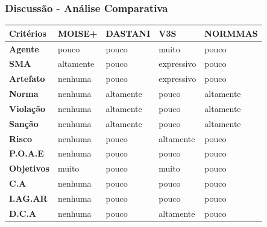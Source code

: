 \documentclass{beamer}
\begin{document}
\begin{frame}
	\frametitle{Discussão - Análise Comparativa}
	\begin{table}[H]
	    \centering
	    \begin{tabular}{|l|l|l|l|l|}
	        \hline
	        \textbf{Critérios} & \textbf{MOISE+}        & \textbf{DASTANI}	& \textbf{V3S}	& \textbf{NORMMAS}	\\ \hline	
	        \textbf{Agente}    & pouco                  & pouco   			& muito                & pouco     \\ \hline         							
	        \textbf{SMA}       & altamente              & pouco             & expressivo           & pouco       \\ \hline							
	        \textbf{Artefato}  & nenhuma                & pouco             & expressivo           & pouco       \\ \hline							
	        \textbf{Norma}     & nenhuma                & altamente		    & pouco                & altamente   \\ \hline								
	        \textbf{Violação}  & nenhuma                & altamente         & pouco                & altamente   \\ \hline							
	        \textbf{Sanção}    & nenhuma                & altamente         & pouco                & altamente   \\ \hline							
	        \textbf{Risco}     & nenhuma                & pouco             & altamente            & pouco       \\ \hline							
	        \textbf{P.O.A.E}   & nenhuma                & pouco             & pouco                & pouco       \\ \hline							
	        \textbf{Objetivos} & muito                  & pouco             & muito                & pouco       \\ \hline 							
	        \textbf{C.A}       & nenhuma                & pouco             & pouco                & pouco       \\ \hline 							
	        \textbf{I.AG.AR}   & nenhuma                & pouco             & pouco                & pouco       \\ \hline							
	        \textbf{D.C.A}     & nenhuma                & pouco				& altamente            & pouco		\\ \hline							
	    \end{tabular}
	\end{table}	
\end{frame}
\end{document}
